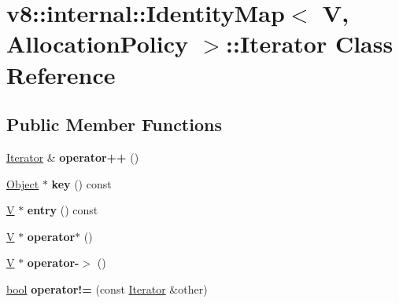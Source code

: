 \hypertarget{classv8_1_1internal_1_1IdentityMap_1_1Iterator}{}\section{v8\+:\+:internal\+:\+:Identity\+Map$<$ V, Allocation\+Policy $>$\+:\+:Iterator Class Reference}
\label{classv8_1_1internal_1_1IdentityMap_1_1Iterator}
\subsection*{Public Member Functions}
\begin{DoxyCompactItemize}
\item 
\mbox{\label{classv8_1_1internal_1_1IdentityMap_1_1Iterator_a671cbf0b835aa793d2c7f51592363dcb}} 
\mbox{\hyperlink{classv8_1_1internal_1_1IdentityMap_1_1Iterator}{Iterator}} \& {\bfseries operator++} ()
\item 
\mbox{\label{classv8_1_1internal_1_1IdentityMap_1_1Iterator_a2f9a1d6f1bf284608e40a2883d80849b}} 
\mbox{\hyperlink{classv8_1_1internal_1_1Object}{Object}} $\ast$ {\bfseries key} () const
\item 
\mbox{\label{classv8_1_1internal_1_1IdentityMap_1_1Iterator_a78c603043ee0ac2550f46b48fe47bd2d}} 
\mbox{\hyperlink{classV}{V}} $\ast$ {\bfseries entry} () const
\item 
\mbox{\label{classv8_1_1internal_1_1IdentityMap_1_1Iterator_af8d43918d3a81556535610d18516ca15}} 
\mbox{\hyperlink{classV}{V}} $\ast$ {\bfseries operator$\ast$} ()
\item 
\mbox{\label{classv8_1_1internal_1_1IdentityMap_1_1Iterator_a32e1433eb43718fd305a3003888bf2af}} 
\mbox{\hyperlink{classV}{V}} $\ast$ {\bfseries operator-\/$>$} ()
\item 
\mbox{\label{classv8_1_1internal_1_1IdentityMap_1_1Iterator_a72685a71099368ea3d3643c09bd4929a}} 
\mbox{\hyperlink{classbool}{bool}} {\bfseries operator!=} (const \mbox{\hyperlink{classv8_1_1internal_1_1IdentityMap_1_1Iterator}{Iterator}} \&other)
\end{DoxyCompactItemize}
